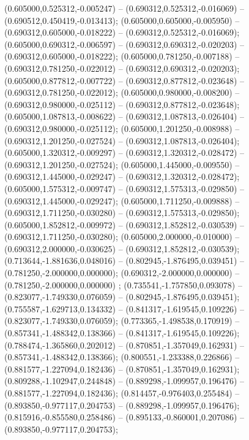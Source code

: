  (0.605000,0.525312,-0.005247) -- (0.690312,0.525312,-0.016069) -- (0.690512,0.450419,-0.013413);
 (0.605000,0.605000,-0.005950) -- (0.690312,0.605000,-0.018222) -- (0.690312,0.525312,-0.016069);
 (0.605000,0.690312,-0.006597) -- (0.690312,0.690312,-0.020203) -- (0.690312,0.605000,-0.018222);
 (0.605000,0.781250,-0.007188) -- (0.690312,0.781250,-0.022012) -- (0.690312,0.690312,-0.020203);
 (0.605000,0.877812,-0.007722) -- (0.690312,0.877812,-0.023648) -- (0.690312,0.781250,-0.022012);
 (0.605000,0.980000,-0.008200) -- (0.690312,0.980000,-0.025112) -- (0.690312,0.877812,-0.023648);
 (0.605000,1.087813,-0.008622) -- (0.690312,1.087813,-0.026404) -- (0.690312,0.980000,-0.025112);
 (0.605000,1.201250,-0.008988) -- (0.690312,1.201250,-0.027524) -- (0.690312,1.087813,-0.026404);
 (0.605000,1.320312,-0.009297) -- (0.690312,1.320312,-0.028472) -- (0.690312,1.201250,-0.027524);
 (0.605000,1.445000,-0.009550) -- (0.690312,1.445000,-0.029247) -- (0.690312,1.320312,-0.028472);
 (0.605000,1.575312,-0.009747) -- (0.690312,1.575313,-0.029850) -- (0.690312,1.445000,-0.029247);
 (0.605000,1.711250,-0.009888) -- (0.690312,1.711250,-0.030280) -- (0.690312,1.575313,-0.029850);
 (0.605000,1.852812,-0.009972) -- (0.690312,1.852812,-0.030539) -- (0.690312,1.711250,-0.030280);
 (0.605000,2.000000,-0.010000) -- (0.690312,2.000000,-0.030625) -- (0.690312,1.852812,-0.030539);
 (0.713644,-1.881636,0.048016) -- (0.802945,-1.876495,0.039451) -- (0.781250,-2.000000,0.000000);
 (0.690312,-2.000000,0.000000) -- (0.781250,-2.000000,0.000000) ;
 (0.735541,-1.757850,0.093078) -- (0.823077,-1.749330,0.076059) -- (0.802945,-1.876495,0.039451);
 (0.755587,-1.629713,0.134332) -- (0.841317,-1.619545,0.109226) -- (0.823077,-1.749330,0.076059);
 (0.773365,-1.498538,0.170919) -- (0.857341,-1.488342,0.138366) -- (0.841317,-1.619545,0.109226);
 (0.788474,-1.365860,0.202012) -- (0.870851,-1.357049,0.162931) -- (0.857341,-1.488342,0.138366);
 (0.800551,-1.233388,0.226866) -- (0.881577,-1.227094,0.182436) -- (0.870851,-1.357049,0.162931);
 (0.809288,-1.102947,0.244848) -- (0.889298,-1.099957,0.196476) -- (0.881577,-1.227094,0.182436);
 (0.814457,-0.976403,0.255484) -- (0.893850,-0.977117,0.204753) -- (0.889298,-1.099957,0.196476);
 (0.815916,-0.855580,0.258486) -- (0.895133,-0.860001,0.207086) -- (0.893850,-0.977117,0.204753);
